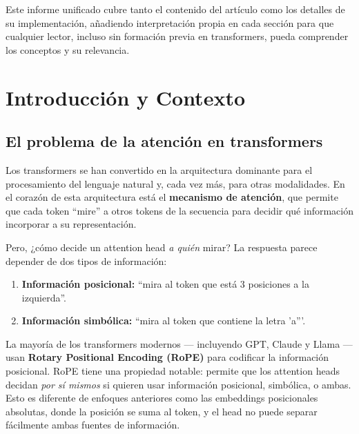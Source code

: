 \documentclass[12pt,a4paper,oneside]{report}
\begin{document}
\vspace{6pt}
Este informe unificado cubre tanto el contenido del artículo como los detalles de su implementación, añadiendo interpretación propia en cada sección para que cualquier lector, incluso sin formación previa en transformers, pueda comprender los conceptos y su relevancia.

\newpage

\chapter{Introducción y Contexto}

\section{El problema de la atención en transformers}

Los transformers se han convertido en la arquitectura dominante para el procesamiento del lenguaje natural y, cada vez más, para otras modalidades. En el corazón de esta arquitectura está el \textbf{mecanismo de atención}, que permite que cada token ``mire'' a otros tokens de la secuencia para decidir qué información incorporar a su representación.

Pero, ¿cómo decide un attention head \emph{a quién} mirar? La respuesta parece depender de dos tipos de información:

\begin{enumerate}
    \item \textbf{Información posicional:} ``mira al token que está 3 posiciones a la izquierda''.
    \item \textbf{Información simbólica:} ``mira al token que contiene la letra 'a'''.
\end{enumerate}

La mayoría de los transformers modernos — incluyendo GPT, Claude y Llama — usan \textbf{Rotary Positional Encoding (RoPE)} para codificar la información posicional. RoPE tiene una propiedad notable: permite que los attention heads decidan \emph{por sí mismos} si quieren usar información posicional, simbólica, o ambas. Esto es diferente de enfoques anteriores como las embeddings posicionales absolutas, donde la posición se suma al token, y el head no puede separar fácilmente ambas fuentes de información.
\end{document}
